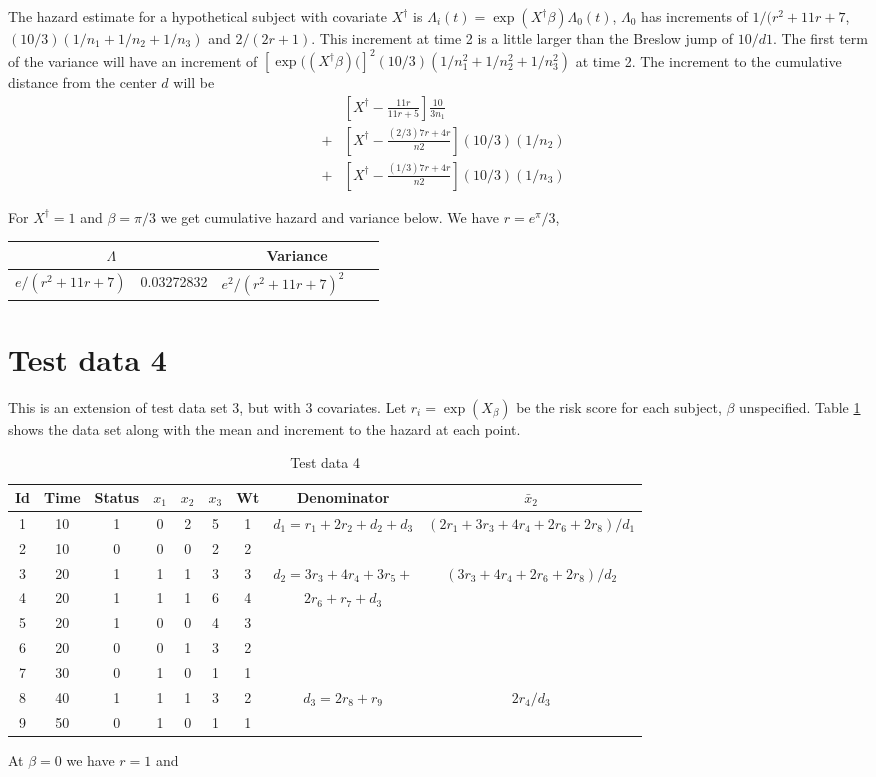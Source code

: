 \documentclass[11pt]{article}
\def\xbar{\bar x}
\begin{document}
The hazard estimate for a hypothetical subject with covariate $X^\dagger$ is
$\Lambda_i(t) = \exp(X^\dagger \beta) \Lambda_0(t)$, 
$\Lambda_0$ has increments of $1/(r^2 + 11r +7$,  
$(10/3)(1/n_1 + 1/n_2 + 1/n_3)$ and $2/(2r+1)$.  
This increment at time 2 is a little larger than the Breslow jump of
$10/d1$.
The first term of the variance will have an increment of
$[\exp((X^\dagger \beta)(]^2 (10/3)(1/n_1^2 + 1/n_2^2 + 1/n_3^2)$ at time 2.
The increment to the cumulative distance from the center $d$ will be
\begin{eqnarray*}
  && \left[X^\dagger - \frac{11r}{11r+5} \right] \frac{10}{3 n_1} \\
  &+& \left[X^\dagger -\frac{(2/3)7r + 4r}{n2} \right] (10/3)(1/n_2) \\
  &+& \left[X^\dagger -\frac{(1/3)7r + 4r}{n2} \right] (10/3)(1/n_3) 
\end{eqnarray*}

For $X^\dagger = 1$ and $\beta=\pi/3$ we get cumulative hazard and variance 
below.  We have $r= e^\pi/3$, 

\begin{tabular}{ll|llr}
\multicolumn{2}{c}{$\Lambda$} & \multicolumn{3}{c}{Variance} \\ \hline
$e/(r^2+ 11r+7)$ &  0.03272832 & $e^2/(r^2+ 11r+7)^2$ & 
\end{tabular}

\section{Test data 4}
This is an extension of test data set 3, but with 3 covariates.
Let $r_i = \exp(X_\beta)$ be the risk score for each subject, $\beta$
unspecified.
Table \ref{tab:val4} shows the data set along with the mean and
increment to the hazard at each point.

\begin{table} \centering
\begin{tabular}{ccccccc|cc}
Id&Time&Status&$x_1$ &$ x_2$& $x_3$ &Wt& Denominator& $\xbar_2$\\
    \hline
1&10& 1& 0& 2 &5 & 1& $d_1= r_1 + 2r_2 + d_2 + d_3$ & 
	  $(2r_1 + 3r_3+ 4r_4 + 2r_6+ 2r_8)/d_1$ \\
2&10& 0& 0& 0 &2&  2&& \\
3&20& 1& 1& 1 &3&  3& $d_2= 3r_3 + 4r_4 +  3r_5 +$ &
	          $(3r_3+ 4r_4 + 2r_6+ 2r_8)/d_2$   \\                
4&20& 1& 1& 1 &6&  4& \qquad $2r_6 + r_7 + d_3$& \\
5&20& 1& 0& 0 &4&  3&& \\
6&20& 0& 0& 1 &3&  2&& \\
7&30& 0& 1& 0 &1&  1&& \\
8&40& 1& 1& 1 &3&  2&   $d_3= 2r_8 + r_9$ & $2r_4/d_3$ \\
9&50& 0& 1& 0 &1&  1 & \\
\end{tabular}
\caption{Test data 4}
\label{tab:val4}
\end{table}

At $\beta=0$ we have $r=1$ and
\end{document}
